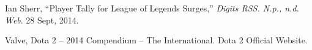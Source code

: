 \documentclass[conference]{IEEEtran}
\begin{document}

%
%
%


\begin{thebibliography}{10}

Ian Sherr, ``Player Tally for League of Legends Surges,'' \textit{Digits RSS. N.p., n.d. Web}. 28 Sept, 2014.

Valve, Dota 2 -- 2014 Compendium -- The International. Dota 2 Official Website.

\end{thebibliography}




\end{document}

